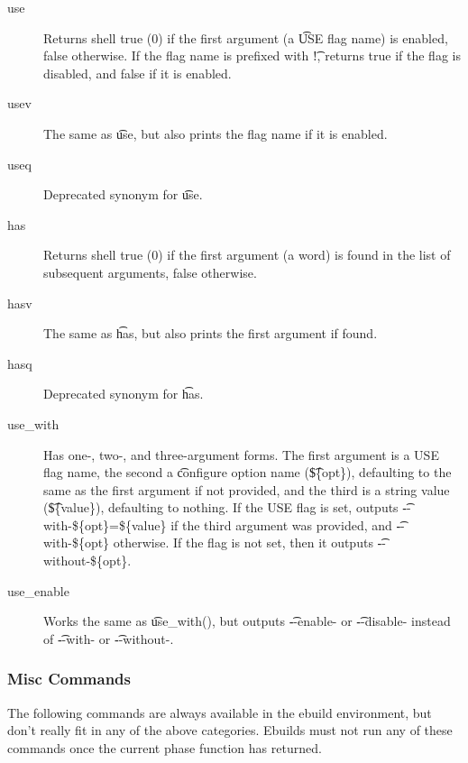 \begin{description}
\item[use] Returns shell true (0) if the first argument (a \t{USE} flag name) is enabled, false
    otherwise.  If the flag name is prefixed with \t{!}, returns true if the flag is disabled, and
    false if it is enabled.
\item[usev] The same as \t{use}, but also prints the flag name if it is enabled.
\item[useq] Deprecated synonym for \t{use}.
\\
\item[has] Returns shell true (0) if the first argument (a word) is found in the list of subsequent
    arguments, false otherwise.
\item[hasv] The same as \t{has}, but also prints the first argument if found.
\item[hasq] Deprecated synonym for \t{has}.
\\
\item[use\_with] Has one-, two-, and three-argument forms. The first argument is a USE flag name,
    the second a \t{configure} option name (\t{\$\{opt\}}), defaulting to the same as the first argument
    if not provided, and the third is a string value (\t{\$\{value\}}), defaulting to nothing. If the
    USE flag is set, outputs \t{-{}-with-\$\{opt\}=\$\{value\}} if the third argument was provided, and
    \t{-{}-with-\$\{opt\}} otherwise. If the flag is not set, then it outputs \t{-{}-without-\$\{opt\}}.

\item[use\_enable] Works the same as \t{use\_with()}, but outputs \t{-{}-enable-} or \t{-{}-disable-}
instead of \t{-{}-with-} or \t{-{}-without-}.
\end{description}

\subsubsection{Misc Commands}
The following commands are always available in the ebuild environment, but don't really fit in any
of the above categories. Ebuilds must not run any of these commands once the current phase function
has returned.

